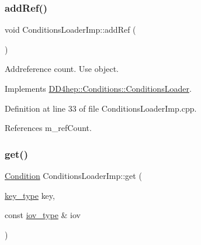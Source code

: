 \subsubsection{\texorpdfstring{add\+Ref()}{addRef()}}
{\footnotesize\ttfamily void Conditions\+Loader\+Imp\+::add\+Ref (\begin{DoxyParamCaption}{ }\end{DoxyParamCaption})\hspace{0.3cm}{\ttfamily [virtual]}}



Addreference count. Use object. 



Implements \hyperlink{class_d_d4hep_1_1_conditions_1_1_conditions_loader_aec8e8abc8bbb54bf20f75c8197b8e71f}{D\+D4hep\+::\+Conditions\+::\+Conditions\+Loader}.



Definition at line 33 of file Conditions\+Loader\+Imp.\+cpp.



References m\+\_\+ref\+Count.

\hypertarget{class_d_d4hep_1_1_conditions_1_1_conditions_loader_imp_a0144aac3062bb704dd2c9557bed207da}{}\label{class_d_d4hep_1_1_conditions_1_1_conditions_loader_imp_a0144aac3062bb704dd2c9557bed207da} 
\subsubsection{\texorpdfstring{get()}{get()}\hspace{0.1cm}{\footnotesize\ttfamily [1/2]}}
{\footnotesize\ttfamily \hyperlink{class_d_d4hep_1_1_conditions_1_1_condition}{Condition} Conditions\+Loader\+Imp\+::get (\begin{DoxyParamCaption}\item[{\hyperlink{class_d_d4hep_1_1_conditions_1_1_conditions_loader_ac77fe60ee60373d61aed19b200949c93}{key\+\_\+type}}]{key,  }\item[{const \hyperlink{class_d_d4hep_1_1_conditions_1_1_conditions_loader_a5647851492a3b1469208473fe6d96329}{iov\+\_\+type} \&}]{iov }\end{DoxyParamCaption})\hspace{0.3cm}{\ttfamily [virtual]}}



